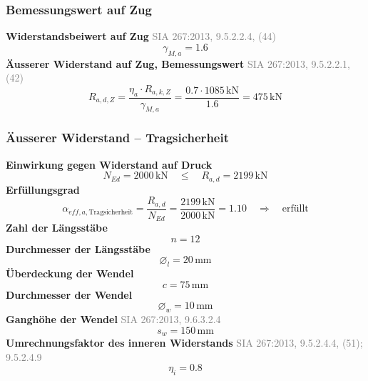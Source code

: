 \documentclass[11pt,a4paper]{article}
\newcommand{\normref}[1]{{\small\textcolor{gray}{#1}}}
\begin{document}
\subsubsection{Bemessungswert auf Zug}
\noindent\textbf{Widerstandsbeiwert auf Zug} \hfill \normref{SIA 267:2013, 9.5.2.2.4, (44)}
\begin{equation*}
\gamma_{M,a} = 1.6
\end{equation*}
\noindent\textbf{Äusserer Widerstand auf Zug, Bemessungswert} \hfill \normref{SIA 267:2013, 9.5.2.2.1, (42)}
\begin{equation*}
R_{a,d,Z} = \frac{\eta_a \cdot R_{a,k,Z}}{\gamma_{M,a}} = \frac{0.7 \cdot 1085\,\mathrm{kN}}{1.6} = 475\,\mathrm{kN}
\end{equation*}
\subsubsection{Äusserer Widerstand – Tragsicherheit}
\noindent\textbf{Einwirkung gegen Widerstand auf Druck}
\begin{equation*}
N_{Ed} = 2000\,\mathrm{kN} \quad \le \quad R_{a,d} = 2199\,\mathrm{kN}
\end{equation*}
\noindent\textbf{Erfüllungsgrad}
\begin{equation*}
\alpha_{eff,a,\text{Tragsicherheit}} = \frac{R_{a,d}}{N_{Ed}} = \frac{2199\,\mathrm{kN}}{2000\,\mathrm{kN}} = 1.10 \quad \Rightarrow \quad \text{erfüllt}
\end{equation*}
\noindent\textbf{Zahl der Längsstäbe}
\begin{equation*}
n = 12
\end{equation*}
\noindent\textbf{Durchmesser der Längsstäbe}
\begin{equation*}
\varnothing_l = 20\,\mathrm{mm}
\end{equation*}
\noindent\textbf{Überdeckung der Wendel}
\begin{equation*}
c = 75\,\mathrm{mm}
\end{equation*}
\noindent\textbf{Durchmesser der Wendel}
\begin{equation*}
\varnothing_w = 10\,\mathrm{mm}
\end{equation*}
\noindent\textbf{Ganghöhe der Wendel} \hfill \normref{SIA 267:2013, 9.6.3.2.4}
\begin{equation*}
s_w = 150\,\mathrm{mm}
\end{equation*}
\noindent\textbf{Umrechnungsfaktor des inneren Widerstands} \hfill \normref{SIA 267:2013, 9.5.2.4.4, (51); 9.5.2.4.9}
\begin{equation*}
\eta_i = 0.8
\end{equation*}
\end{document}
